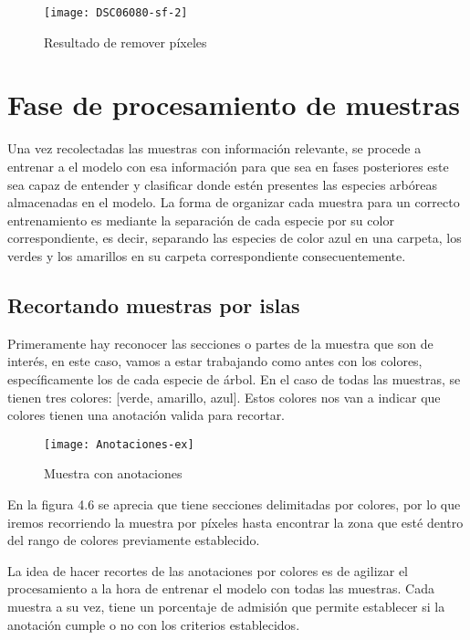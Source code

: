 \begin{figure} [!h]
	\centering
	\begin{minipage}[b]{0.65\textwidth}
		\texttt{[image: DSC06080-sf-2]}
		\caption{Resultado de remover píxeles}
	\end{minipage}
\end{figure}

\break

\section{Fase de procesamiento de muestras}
Una vez recolectadas las muestras con información relevante, se procede a  entrenar a el modelo con esa información para que sea en fases posteriores este sea capaz de entender y clasificar donde estén presentes las especies arbóreas almacenadas en el modelo. La forma de organizar cada muestra para un correcto entrenamiento es mediante la separación de cada especie por su color correspondiente, es decir, separando las especies de color azul en una carpeta, los verdes y los amarillos en su carpeta correspondiente consecuentemente.

\subsection{Recortando muestras por islas}
Primeramente hay reconocer las secciones o partes de la muestra que son de interés, en este caso, vamos a estar trabajando como antes con los colores, específicamente los de cada especie de árbol. En el caso de todas las muestras, se tienen tres colores: [verde, amarillo, azul]. Estos colores nos van a indicar que colores tienen una anotación valida para recortar.


\begin{figure}[H]
  \centering
  \begin{minipage}[b]{0.65\textwidth}
        \texttt{[image: Anotaciones-ex]}
    \caption{Muestra con anotaciones}
  \end{minipage}
\end{figure}
\newpage

En la figura 4.6 se aprecia que tiene secciones delimitadas por colores, por lo que iremos recorriendo la muestra por píxeles hasta encontrar la zona que esté dentro del rango de colores previamente establecido.

La idea de hacer recortes de las anotaciones por colores es de agilizar el procesamiento a la hora de entrenar el modelo con todas las muestras. Cada muestra a su vez, tiene un porcentaje de admisión que permite establecer si la anotación cumple o no con los criterios establecidos.

